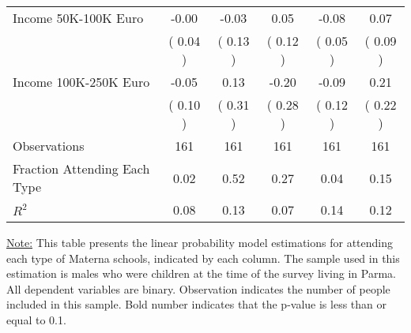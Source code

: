 \begin{table}[H]
{\begin{tabular}{lccccc}
\quad Income 50K-100K Euro &     -0.00 &     -0.03 &      0.05 &     -0.08 &      0.07 \\
\quad  & (     0.04 ) & (     0.13 )  & (     0.12 )  & (     0.05 ) & (     0.09 ) \\
\quad Income 100K-250K Euro &     -0.05 &      0.13 &     -0.20 &     -0.09 &      0.21 \\
\quad  & (     0.10 ) & (     0.31 )  & (     0.28 )  & (     0.12 ) & (     0.22 ) \\
\midrule
Observations & 161 & 161 & 161 & 161 & 161 \\
Fraction Attending Each Type &      0.02 &      0.52 &      0.27 &      0.04 &      0.15 \\
\midrule
$ R^2$ &      0.08 &      0.13 &      0.07 &      0.14 &      0.12 \\
\bottomrule
\end{tabular}}
\end{table}
\begin{footnotesize}
\noindent\underline{Note:} This table presents the linear probability model estimations for attending each type of Materna schools, indicated by each column. The sample used in this estimation is males who were children at the time of the survey living in Parma. All dependent variables are binary. Observation indicates the number of people included in this sample. Bold number indicates that the p-value is less than or equal to 0.1.
\end{footnotesize}
